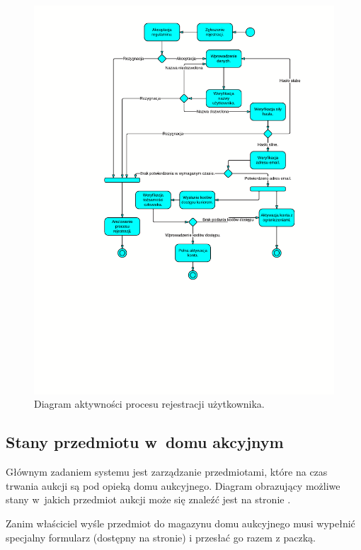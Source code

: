 \documentclass[10pt,a4paper]{article}
\begin{document}
\newpage
\begin{figure}[p]
  \begin{adjustwidth}{-3cm}{-3cm}
    \centering
    \includegraphics{figury/aktywnosc-rejestracja-uzytkownika}
    \caption{Diagram aktywności procesu rejestracji użytkownika.}
    \label{fig:aktywnosc_rejestracja_uzytkownika}
  \end{adjustwidth}
\end{figure}
\clearpage

\subsection{Stany przedmiotu w~domu akcyjnym}

Głównym zadaniem systemu jest zarządzanie przedmiotami, które na czas trwania
aukcji są pod opieką domu aukcyjnego. Diagram obrazujący możliwe stany w~jakich
przedmiot aukcji może się znaleźć jest na stronie \pageref{fig:stan_przedmiot}.

Zanim właściciel wyśle przedmiot do magazynu domu aukcyjnego musi
wypełnić specjalny formularz (dostępny na stronie) i przesłać go razem z
paczką.
\end{document}
